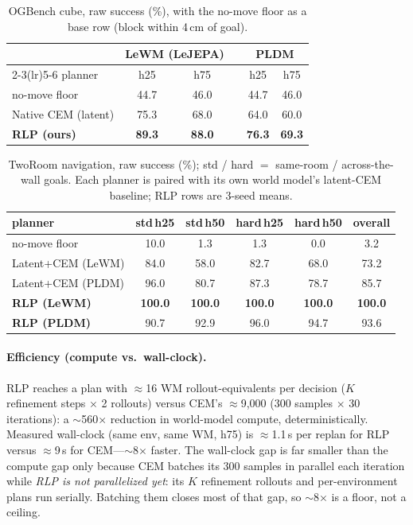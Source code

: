 \documentclass{article} %
\theoremstyle{plain}
\theoremstyle{definition}
\begin{document}
\begin{table}[H]
\caption{OGBench cube, raw success (\%), with the no-move floor as a base row
(block within 4\,cm of goal).}
\label{tab:raw}
\begin{center}
\small
\begin{tabular}{l cc c cc}
\toprule
& \multicolumn{2}{c}{\bf LeWM (LeJEPA)} & & \multicolumn{2}{c}{\bf PLDM}\\
\cmidrule(lr){2-3}\cmidrule(lr){5-6}
planner & h25 & h75 & & h25 & h75\\
\midrule
no-move floor & 44.7 & 46.0 & & 44.7 & 46.0\\
Native CEM (latent) & 75.3 & 68.0 & & 64.0 & 60.0\\
\textbf{RLP (ours)} & \textbf{89.3} & \textbf{88.0} & & \textbf{76.3} & \textbf{69.3}\\
\bottomrule
\end{tabular}
\end{center}
\end{table}

\begin{table}[H]
\caption{TwoRoom navigation, raw success (\%); std / hard $=$ same-room /
across-the-wall goals. Each planner is paired with its own world model's
latent-CEM baseline; RLP rows are 3-seed means.}
\label{tab:tr}
\begin{center}
\small
\begin{tabular}{l ccccc}
\toprule
planner & std\,h25 & std\,h50 & hard\,h25 & hard\,h50 & overall\\
\midrule
no-move floor & 10.0 & 1.3 & 1.3 & 0.0 & 3.2\\
Latent+CEM (LeWM) & 84.0 & 58.0 & 82.7 & 68.0 & 73.2\\
Latent+CEM (PLDM) & 96.0 & 80.7 & 87.3 & 78.7 & 85.7\\
\textbf{RLP (LeWM)} & \textbf{100.0} & \textbf{100.0} & \textbf{100.0} & \textbf{100.0} & \textbf{100.0}\\
\textbf{RLP (PLDM)} & 90.7 & 92.9 & 96.0 & 94.7 & 93.6\\
\bottomrule
\end{tabular}
\end{center}
\end{table}

\paragraph{Efficiency (compute vs.\ wall-clock).} RLP reaches a plan with
$\approx$16 WM rollout-equivalents per decision ($K$ refinement steps $\times$ 2
rollouts) versus CEM's $\approx$9{,}000 (300 samples $\times$ 30 iterations): a
$\sim$560$\times$ reduction in world-model compute, deterministically. Measured
wall-clock (same env, same WM, h75) is $\approx$1.1\,s per replan for RLP versus
$\approx$9\,s for CEM---$\sim$8$\times$ faster. The wall-clock gap is far smaller
than the compute gap only because CEM batches its 300 samples in parallel each
iteration while \emph{RLP is not parallelized yet}: its $K$ refinement rollouts
and per-environment plans run serially. Batching them closes most of that gap, so
$\sim$8$\times$ is a floor, not a ceiling.
\end{document}
